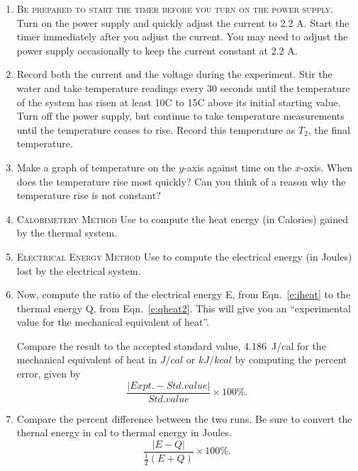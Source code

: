 \begin{enumerate}
\item
\textsc{Be prepared to start the timer before you turn on the power supply.}
Turn on the power supply and quickly adjust the current to 2.2 A.  Start the timer immediately after you adjust the current.  You may need to adjust the power supply occasionally to keep the current constant at 2.2 A.  

\item
Record both the current and the voltage during the experiment.  Stir the water and take temperature readings every 30 seconds until the temperature of the system has risen at least 10\degree C to 15\degree C above its initial starting value.  Turn off the power supply, but continue to take temperature measurements until the temperature ceases to rise. Record this temperature as $T_2$, the final temperature.

\item
Make a graph of temperature on the $y$-axis against time on the $x$-axis.  When does the temperature rise most quickly?  Can you think of a reason why the temperature rise is not constant?

\item
\textsc{Calorimetery Method}  Use  to compute the heat energy (in Calories) gained by the thermal system. 

\item
\textsc{Electrical Energy Method}  Use  to compute the electrical energy (in Joules) lost by the electrical system.

\item
Now, compute the ratio of the electrical energy E, from Eqn.~\ref{e:iheat} to the thermal energy Q, from Eqn.~\ref{e:qheat2}.  This will give you an ``experimental value for the mechanical equivalent of heat''.

Compare the result to the accepted standard value, \SI{4.186}{J/cal} for the mechanical equivalent of heat 
in $J/cal$ or $kJ/kcal$ by computing the percent error, given by
\[ \frac{|Expt. - Std. value|}{Std. value} \times 100\%. \]

\item Compare the percent difference between the two runs. Be sure to convert the thernal energy in cal to thermal energy in Joules.
\[ \frac{|E - Q|}{\frac{1}{2}(E+Q)} \times 100\%. \]
\end{enumerate}

